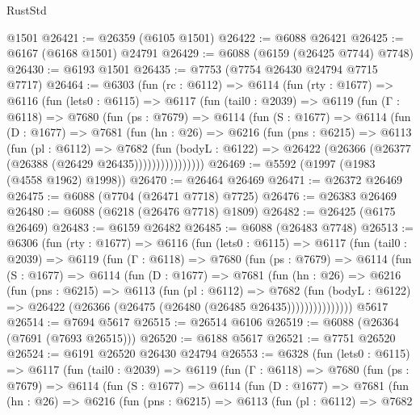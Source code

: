 \begin{lexlean}{RustStd}
\begin{coremodule}
    @1501
@26421 := @26359 (@6105 @1501)
@26422 := @6088 @26421
@26425 := @6167 (@6168 @1501) @24791
@26429 := @6088 (@6159 (@26425 @7744) @7748)
@26430 := @6193 @1501
@26435 := @7753 (@7754 @26430 @24794 @7715 @7717)
@26464 := @6303
    (fun (rc : @6112) =>
    @6114
      (fun (rty : @1677) =>
      @6116
        (fun (lets0 : @6115) =>
        @6117
          (fun (tail0 : @2039) =>
          @6119
            (fun (Γ : @6118) =>
            @7680
              (fun (ps : @7679) =>
              @6114
                (fun (S : @1677) =>
                @6114
                  (fun (D : @1677) =>
                  @7681
                    (fun (hn : @26) =>
                    @6216
                      (fun (pns : @6215) =>
                      @6113
                        (fun (pl : @6112) =>
                        @7682
                          (fun (bodyL : @6122) =>
                          @26422 (@26366 (@26377 (@26388 (@26429 @26435))))))))))))))))
@26469 := @5592 (@1997 (@1983 (@4558 @1962) @1998))
@26470 := @26464 @26469
@26471 := @26372 @26469
@26475 := @6088 (@7704 (@26471 @7718) @7725)
@26476 := @26383 @26469
@26480 := @6088 (@6218 (@26476 @7718) @1809)
@26482 := @26425 (@6175 @26469)
@26483 := @6159 @26482
@26485 := @6088 (@26483 @7748)
@26513 := @6306
    (fun (rty : @1677) =>
    @6116
      (fun (lets0 : @6115) =>
      @6117
        (fun (tail0 : @2039) =>
        @6119
          (fun (Γ : @6118) =>
          @7680
            (fun (ps : @7679) =>
            @6114
              (fun (S : @1677) =>
              @6114
                (fun (D : @1677) =>
                @7681
                  (fun (hn : @26) =>
                  @6216
                    (fun (pns : @6215) =>
                    @6113
                      (fun (pl : @6112) =>
                      @7682
                        (fun (bodyL : @6122) =>
                        @26422 (@26366 (@26475 (@26480 (@26485 @26435)))))))))))))))
    @5617
@26514 := @7694 @5617
@26515 := @26514 @6106
@26519 := @6088 (@26364 (@7691 (@7693 @26515)))
@26520 := @6188 @5617
@26521 := @7751 @26520
@26524 := @6191 @26520 @26430 @24794
@26553 := @6328
    (fun (lets0 : @6115) =>
    @6117
      (fun (tail0 : @2039) =>
      @6119
        (fun (Γ : @6118) =>
        @7680
          (fun (ps : @7679) =>
          @6114
            (fun (S : @1677) =>
            @6114
              (fun (D : @1677) =>
              @7681
                (fun (hn : @26) =>
                @6216
                  (fun (pns : @6215) =>
                  @6113
                    (fun (pl : @6112) =>
                    @7682

\end{coremodule}
\end{lexlean}

